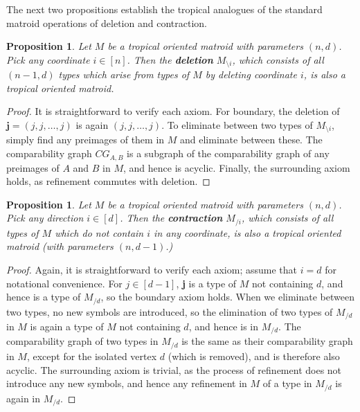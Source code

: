 \documentclass[11pt]{amsart}
\newtheorem{prop}[thm]{Proposition}
\begin{document}

The next two propositions establish the tropical analogues of the standard matroid operations of deletion and contraction.

\begin{prop}
Let $M$ be a tropical oriented matroid with parameters $(n, d)$. Pick any coordinate $i\in [n]$. Then the \textbf{deletion} $M_{\setminus 
i}$, which consists of all $(n-1, d)$ types which arise from types of $M$ by deleting coordinate $i$, is also a tropical oriented matroid.
\end{prop}

\begin{proof}
It is straightforward to verify each axiom. For boundary, the deletion of $\textbf{j}=(j, j, \ldots, j)$ is again $(j, j, \ldots, j)$. To 
eliminate between two types of $M_{\setminus i}$, simply find any preimages of them in $M$ and eliminate between these. The 
comparability graph $CG_{A, B}$ is a subgraph of the comparability graph of any preimages of $A$ and $B$ 
in $M$, and hence is 
acyclic. Finally, the surrounding axiom holds, as refinement commutes with deletion.
\end{proof}

\begin{prop}
Let $M$ be a tropical oriented matroid with parameters $(n, d)$. Pick any direction $i\in [d]$. Then the \textbf{contraction} $M_{/i}$, which 
consists of all types of $M$ which do not contain $i$ in any coordinate, is also a tropical oriented matroid (with parameters $(n, d-1)$.)
\end{prop}

\begin{proof}
Again, it is straightforward to verify each axiom; assume that $i=d$ for notational convenience. For $j\in [d-1]$, \textbf{j} is a type of $M$ 
not containing $d$, and hence is a type of $M_{/d}$, so the boundary axiom holds. When we eliminate between two types, no new symbols are 
introduced, so the elimination of two types of $M_{/d}$ in $M$ is again a type of $M$ not containing $d$, and hence is in $M_{/d}$. The comparability graph of two types in $M_{/d}$ is the same as their comparability graph in $M$, except for the isolated vertex $d$ (which is removed), and is therefore also acyclic. The surrounding axiom is trivial, as the process of refinement does not introduce any new symbols, and hence any refinement in $M$ of a type in $M_{/d}$ is again in $M_{/d}$. 
\end{proof}
\end{document}
